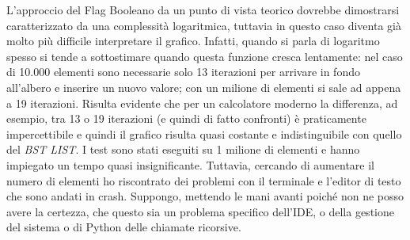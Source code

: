 \documentclass{article}
\begin{document}
\begin{minipage}[t]{\linewidth}
\begin{multicols}{2}
\begin{minipage}{\linewidth}
    \centering
    \label{tab:bst-insertion-summarised}
\end{minipage}
\columnbreak
\begin{minipage}{\linewidth}
    \centering
    \label{tab:bst-insertion-iterations-summarised}
\end{minipage}
\end{multicols}
\end{minipage}
\vspace{15px}




\vspace{15px}

L'approccio del Flag Booleano da un punto di vista teorico dovrebbe dimostrarsi caratterizzato da una complessità logaritmica, tuttavia in questo caso diventa già molto più difficile interpretare il grafico.
Infatti, quando si parla di logaritmo spesso si tende a sottostimare quando questa funzione cresca lentamente: nel caso di 10.000 elementi sono necessarie solo 13 iterazioni per arrivare in fondo all'albero e inserire un nuovo valore; con un milione di elementi si sale ad appena a 19 iterazioni. Risulta evidente che per un calcolatore moderno la differenza, ad esempio, tra 13 o 19 iterazioni (e quindi di fatto confronti) è praticamente impercettibile e quindi il grafico risulta quasi costante e indistinguibile con quello del \textit{BST LIST}.
I test sono stati eseguiti su 1 milione di elementi e hanno impiegato un tempo quasi insignificante. Tuttavia, cercando di aumentare il numero di elementi ho riscontrato dei problemi con il terminale e l'editor di testo che sono andati in crash. Suppongo, mettendo le mani avanti poiché non ne posso avere la certezza, che questo sia un problema specifico dell'IDE, o della gestione del sistema o di Python delle chiamate ricorsive.
\end{document}
